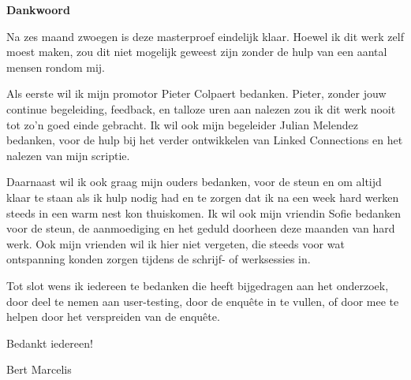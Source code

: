 \thispagestyle{empty}    %
\begin{center}
\textbf{Dankwoord}
\end{center}

Na zes maand zwoegen is deze masterproef eindelijk klaar. Hoewel ik dit werk zelf moest maken, zou dit niet mogelijk geweest zijn zonder de hulp van een aantal mensen rondom mij. 

Als eerste wil ik mijn promotor Pieter Colpaert bedanken. Pieter, zonder jouw continue begeleiding, feedback, en talloze uren aan nalezen zou ik dit werk nooit tot zo'n goed einde gebracht. Ik wil ook mijn begeleider Julian Melendez bedanken, voor de hulp bij het verder ontwikkelen van Linked Connections en het nalezen van mijn scriptie.

Daarnaast wil ik ook graag mijn ouders bedanken, voor de steun en om altijd klaar te staan als ik hulp nodig had en te zorgen dat ik na een week hard werken steeds in een warm nest kon thuiskomen. Ik wil ook mijn vriendin Sofie bedanken voor de steun, de aanmoediging en het geduld doorheen deze maanden van hard werk. Ook mijn vrienden wil ik hier niet vergeten, die steeds voor wat ontspanning konden zorgen tijdens de schrijf- of werksessies in.

Tot slot wens ik iedereen te bedanken die heeft bijgedragen aan het onderzoek, door deel te nemen aan user-testing, door de enquête in te vullen, of door mee te helpen door het verspreiden van de enquête.

Bedankt iedereen!

Bert Marcelis
